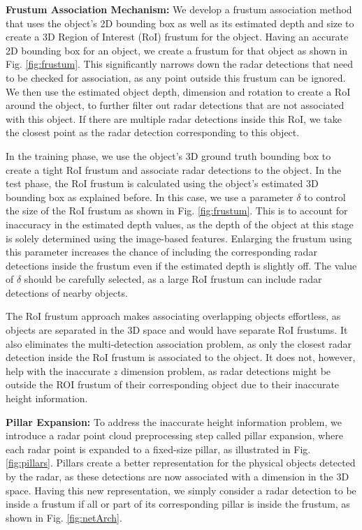 \documentclass[10pt,twocolumn,letterpaper]{article}
\begin{document}
   \textbf{Frustum Association Mechanism:}
   We develop a frustum association method that uses the object's 2D bounding 
   box as well as its estimated depth and size to create a 3D Region of Interest (RoI)
   frustum for the object. Having an accurate 2D bounding box for an object, we create 
   a frustum for that object as shown in Fig. \ref{fig:frustum}. This significantly
   narrows down the radar detections that need to be checked for association, as any
   point outside this frustum can be ignored. We then use the estimated object depth,
   dimension and rotation to create a RoI around the object, to further filter out 
   radar detections that are not associated with this object. If there are multiple 
   radar detections inside this RoI, we take the closest point as the radar detection 
   corresponding to this object. 
   
   In the training phase, we use the object's 3D ground truth bounding box
   to create a tight RoI frustum and associate radar detections to the object. 
   In the test phase, the RoI frustum is calculated 
   using the object's estimated 3D bounding box as explained before. In this case, 
   we use a parameter $\delta$ to control the size of the RoI frustum
   as shown in Fig. \ref{fig:frustum}.
   This is to account for inaccuracy in the estimated depth values, as the depth 
   of the object at this stage is solely determined using the image-based features. 
   Enlarging the frustum using this parameter increases the chance
   of including the corresponding radar detections inside the frustum even if 
   the estimated depth is slightly off. The value of $\delta$ should be carefully 
   selected, as a large RoI frustum can include radar detections of nearby objects.
   
   The RoI frustum approach makes associating
   overlapping objects effortless, as objects are separated in the 3D space 
   and would have separate RoI frustums. It also eliminates the multi-detection 
   association problem, as only the closest radar detection inside the RoI frustum
   is associated to the object. It does not, however, help with the inaccurate 
   $z$ dimension problem, as radar detections might be outside the 
   ROI frustum of their corresponding object due to their inaccurate height 
   information. 
   
   \textbf{Pillar Expansion:}
   To address the inaccurate height information problem, we introduce a radar 
   point cloud preprocessing 
   step called pillar expansion, where each radar point is expanded to 
   a fixed-size pillar, as illustrated in Fig. \ref{fig:pillars}.
   Pillars create a better representation for the physical objects detected
   by the radar, as these detections are now associated with a dimension in 
   the 3D space. Having this new representation, we simply consider a radar detection to be inside a frustum 
   if all or part of its corresponding pillar is inside the frustum, as shown 
   in Fig. \ref{fig:netArch}.
   
\end{document}
